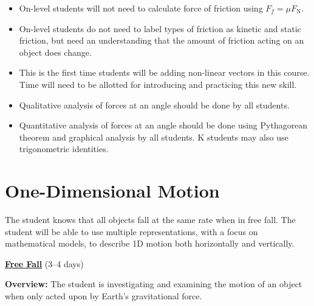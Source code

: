 \documentclass[dvipsnames]{article}
\begin{document}
\begin{itemize}[topsep=-3pt,itemsep=0pt]
    \item On-level students will not need to calculate force of friction using $F_f = \mu F_\mathrm{N}$. 
    \item On-level students do not need to label types of friction as kinetic and static friction, but need an understanding that the amount of friction acting on an object does change.
    \item This is the first time students will be adding non-linear vectors in this course. Time will need to be allotted for introducing and practicing this new skill.
    \item Qualitative analysis of forces at an angle should be done by all students.
    \item Quantitative analysis of forces at an angle should be done using Pythagorean theorem and graphical analysis by all students. K students may also use trigonometric identities.
\end{itemize}



\section{One-Dimensional Motion}

\vspace{-3pt}
The student knows that all objects fall at the same rate when in free fall. The student will be able to use multiple representations, with a focus on mathematical models, to describe 1D motion both horizontally and vertically.
\vspace{3pt}

\textbf{\underline{Free Fall}} (3--4 days)

\textbf{Overview:} The student is investigating and examining the motion of an object when only acted upon by Earth's gravitational force.
\end{document}
